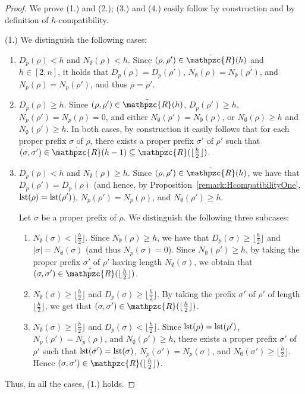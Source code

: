  \begin{proof} We prove (1.) and (2.); (3.) and (4.) easily follow by construction and by definition of $h$-compatibility.

 (1.) We distinguish the following cases:
 \begin{enumerate}
  \item $D_p(\rho)<h$ and $N_\emptyset(\rho)<h$. Since $(\rho,\rho')\in \tilde{\mathpzc{R}}(h)$ and $h\in [2,n]$, it holds that $D_p(\rho)=D_p(\rho')$, $N_\emptyset(\rho)=N_\emptyset(\rho')$, and $N_p(\rho)=N_p(\rho')$, and thus $\rho=\rho'$.
  \item $D_p(\rho)\geq h$. Since $(\rho,\rho')\in \tilde{\mathpzc{R}}(h)$, $D_p(\rho')\geq h$, $N_p(\rho')=N_p(\rho)=0$,  and either $N_\emptyset(\rho')=N_\emptyset(\rho)$, or $N_\emptyset(\rho)\geq h$ and $N_\emptyset(\rho')\geq h$. In both cases, by construction it easily follows that for each proper prefix $\sigma$ of $\rho$,
      there exists a proper prefix $\sigma'$ of $\rho'$ such that $(\sigma,\sigma')\in \tilde{\mathpzc{R}}(h-1)\subseteq \tilde{\mathpzc{R}}(\lfloor \frac{h}{2}\rfloor)$.
  \item $D_p(\rho)<h$ and $N_\emptyset(\rho)\geq h$. Since $(\rho,\rho')\in \tilde{\mathpzc{R}}(h)$, we have that $D_p(\rho')=D_p(\rho)$ (and hence, by Proposition~\ref{remark:HcompatibilityOne}, $\operatorname{lst}(\rho)=\operatorname{lst}(\rho')$), $N_p(\rho')=N_p(\rho)$,  and $N_\emptyset(\rho')\geq h$.
  
  Let $\sigma$ be a proper prefix of $\rho$. We distinguish the following three subcases:
 \begin{enumerate}
   \item $N_\emptyset(\sigma)< \lfloor \frac{h}{2}\rfloor$. Since $N_\emptyset(\rho)\geq h$, we have that $D_p(\sigma)\geq \lfloor \frac{h}{2}\rfloor$ and $|\sigma|=N_\emptyset(\sigma)$ (and thus $N_p(\sigma)=0$). Since
    $N_\emptyset(\rho')\geq h$, by taking the proper prefix $\sigma'$ of $\rho'$ having length $N_\emptyset(\sigma)$, we obtain that
    $(\sigma,\sigma')\in  \tilde{\mathpzc{R}}(\lfloor \frac{h}{2}\rfloor)$.
   \item $N_\emptyset(\sigma)\geq  \lfloor \frac{h}{2}\rfloor$ and $D_p(\sigma)\geq  \lfloor \frac{h}{2}\rfloor$. By taking the prefix $\sigma'$ of
   $\rho'$ of length $\lfloor \frac{h}{2}\rfloor$, we get that $(\sigma,\sigma')\in  \tilde{\mathpzc{R}}(\lfloor \frac{h}{2}\rfloor)$.
   \item  $N_\emptyset(\sigma)\geq  \lfloor \frac{h}{2}\rfloor$ and $D_p(\sigma)<  \lfloor \frac{h}{2}\rfloor$. Since $\operatorname{lst}(\rho)=\operatorname{lst}(\rho')$, $N_p(\rho')=N_p(\rho)$,
   and $N_\emptyset(\rho')\geq h$,
   there exists a proper prefix $\sigma'$ of $\rho'$ such that $\operatorname{lst}(\sigma')=\operatorname{lst}(\sigma)$,  $N_p(\sigma')=N_p(\sigma)$, and
    $N_\emptyset(\sigma')\geq  \lfloor \frac{h}{2}\rfloor$. Hence $(\sigma,\sigma')\in  \tilde{\mathpzc{R}}(\lfloor \frac{h}{2}\rfloor)$.
 \end{enumerate}
\end{enumerate}
Thus, in all the cases, (1.) holds.


\end{proof}
